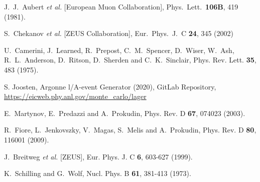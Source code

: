 \documentclass[prd,amsmath,%
twocolumn,floatfix,amssymb, preprintnumbers, linenumbers,nofootinbib, superscriptaddress]{revtex4}
\begin{document}
\begin{thebibliography}{99}
  J.~J.~Aubert {\it et al.} [European Muon Collaboration],
  Phys.\ Lett.\  {\bf 106B}, 419 (1981).
 


  S.~Chekanov {\it et al.} [ZEUS Collaboration],
  Eur.\ Phys.\ J.\ C \textbf{24}, 345 (2002)


U.~Camerini, J.~Learned, R.~Prepost, C.~M.~Spencer, D.~Wiser, W.~Ash, R.~L.~Anderson, D.~Ritson, D.~Sherden and C.~K.~Sinclair,
Phys. Rev. Lett. \textbf{35}, 483 (1975).



S. Joosten, Argonne l/A-event Generator (2020), GitLab Repository,
\url{https://eicweb.phy.anl.gov/monte_carlo/lager}


E.~Martynov, E.~Predazzi and A.~Prokudin,
Phys. Rev. D \textbf{67}, 074023 (2003).

R.~Fiore, L.~Jenkovszky, V.~Magas, S.~Melis and A.~Prokudin,
Phys. Rev. D \textbf{80}, 116001 (2009). 

J.~Breitweg \textit{et al.} [ZEUS],
Eur. Phys. J. C \textbf{6}, 603-627 (1999). 


K.~Schilling and G.~Wolf,
Nucl. Phys. B \textbf{61}, 381-413 (1973).


\end{thebibliography}
\end{document}
